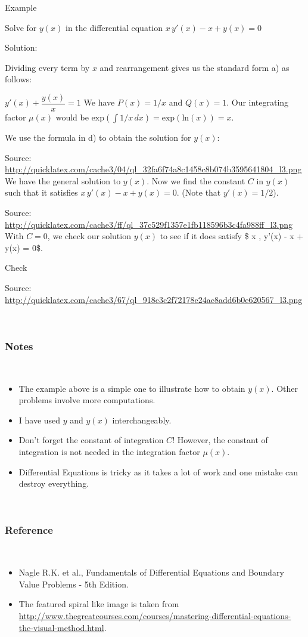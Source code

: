 \documentclass[]{article}
\begin{document}
Example

Solve for \(y(x)\) in the differential equation
\(\displaystyle x \, y'(x) - x + y(x) = 0\)

Solution:

Dividing every term by \(x\) and rearrangement gives us the standard
form a) as follows:

\(\displaystyle y'(x) + \dfrac{y(x)}{x} = 1\) We have \(P(x) = 1/x\) and
\(Q(x) = 1\). Our integrating factor \(\mu(x)\) would be
\(\text{exp}(\int 1/x \, dx) = \text{exp}( \text{ln}(x)) = x\).

We use the formula in d) to obtain the solution for \(y(x)\):

Source:
\url{http://quicklatex.com/cache3/04/ql_32fa6f74a8c1458c8b074b3595641804_l3.png}
We have the general solution to \(y(x)\). Now we find the constant \(C\)
in \(y(x)\) such that it satisfies \(x \, y'(x) - x + y(x) = 0\). (Note
that \(y'(x) = 1/2\)).

Source:
\url{http://quicklatex.com/cache3/ff/ql_37c529f1357e1fb118596b3c4fa988ff_l3.png}
With \(C = 0\), we check our solution \(y(x)\) to see if it does satisfy
\$ x , y'(x) - x + y(x) = 0\$.

Check

Source:
\url{http://quicklatex.com/cache3/67/ql_918c3c2f72178e24ac8add6b0e620567_l3.png}

~

\subsubsection{Notes}\label{notes}

~

\begin{itemize}
\item
  The example above is a simple one to illustrate how to obtain
  \(y(x)\). Other problems involve more computations.
\item
  I have used \(y\) and \(y(x)\) interchangeably.
\item
  Don't forget the constant of integration \(C\)! However, the constant
  of integration is not needed in the integration factor \(\mu(x)\).
\item
  Differential Equations is tricky as it takes a lot of work and one
  mistake can destroy everything.
\end{itemize}

~

\subsubsection{Reference}\label{reference}

~

\begin{itemize}
\item
  Nagle R.K. et al., Fundamentals of Differential Equations and Boundary
  Value Problems - 5th Edition.
\item
  The featured spiral like image is taken from
  \url{http://www.thegreatcourses.com/courses/mastering-differential-equations-the-visual-method.html}.
\end{itemize}
\end{document}
